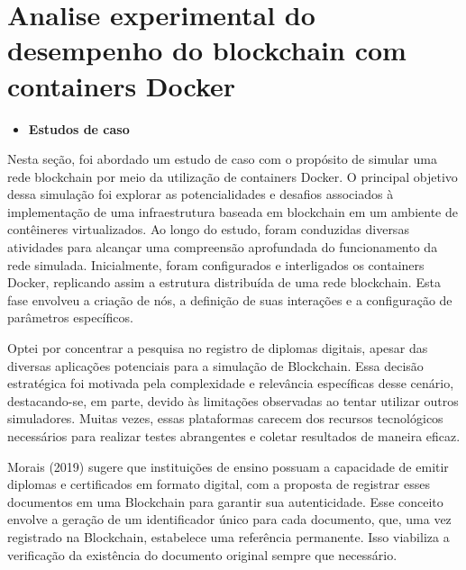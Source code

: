 
\chapter{Analise experimental do desempenho do blockchain  com containers Docker}
\label{chapter_experimento}


        \begin{itemize}[label= $\ast$]
            \item \textbf{Estudos de caso}
        \end{itemize}

        Nesta seção, foi abordado um estudo de caso com o propósito de simular uma rede blockchain por meio da utilização de containers Docker. O principal objetivo dessa simulação foi explorar as potencialidades e desafios associados à implementação de uma infraestrutura baseada em blockchain em um ambiente de contêineres virtualizados. Ao longo do estudo, foram conduzidas diversas atividades para alcançar uma compreensão aprofundada do funcionamento da rede simulada. Inicialmente, foram configurados e interligados os containers Docker, replicando assim a estrutura distribuída de uma rede blockchain. Esta fase envolveu a criação de nós, a definição de suas interações e a configuração de parâmetros específicos.

        Optei por concentrar a pesquisa no registro de diplomas digitais, apesar das diversas aplicações potenciais para a simulação de Blockchain. Essa decisão estratégica foi motivada pela complexidade e relevância específicas desse cenário, destacando-se, em parte, devido às limitações observadas ao tentar utilizar outros simuladores. Muitas vezes, essas plataformas carecem dos recursos tecnológicos necessários para realizar testes abrangentes e coletar resultados de maneira eficaz.

        Morais (2019) sugere que instituições de ensino possuam a capacidade de emitir diplomas e certificados em formato digital, com a proposta de registrar esses documentos em uma Blockchain para garantir sua autenticidade. Esse conceito envolve a geração de um identificador único para cada documento, que, uma vez registrado na Blockchain, estabelece uma referência permanente. Isso viabiliza a verificação da existência do documento original sempre que necessário.

